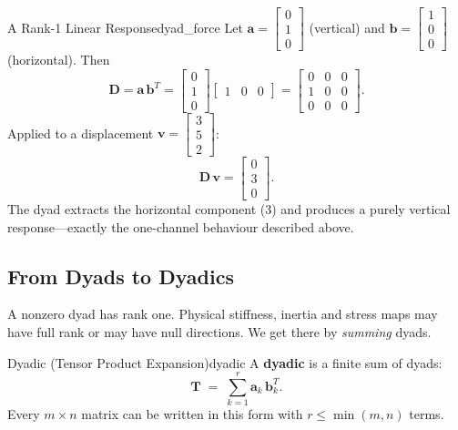 \begin{example}{A Rank-1 Linear Response}{dyad_force}
Let $\mathbf{a} = \begin{bmatrix}0\\1\\0\end{bmatrix}$ (vertical)
and $\mathbf{b} = \begin{bmatrix}1\\0\\0\end{bmatrix}$ (horizontal).
Then
\[
  \mathbf{D}
  = \mathbf{a}\,\mathbf{b}^{T}
  = \begin{bmatrix}0\\1\\0\end{bmatrix}
    \begin{bmatrix}1&0&0\end{bmatrix}
  = \begin{bmatrix}0&0&0\\1&0&0\\0&0&0\end{bmatrix}.
\]
Applied to a displacement
$\mathbf{v}=\begin{bmatrix}3\\5\\2\end{bmatrix}$:
\[
  \mathbf{D}\,\mathbf{v}
  = \begin{bmatrix}0\\3\\0\end{bmatrix}.
\]
The dyad extracts the horizontal component ($3$) and produces a
purely vertical response---exactly the one-channel behaviour
described above.
\end{example}

\subsection{From Dyads to Dyadics}
\label{subsec:dyadics}

A nonzero dyad has rank one. Physical stiffness, inertia and stress maps may have full rank or may have null directions.  We get there by \emph{summing} dyads.

\begin{definition}{\texorpdfstring{Dyadic (Tensor Product Expansion)}{Dyadic (Tensor Product Expansion)}}{dyadic}
A \textbf{dyadic} is a finite sum of dyads:
\[
  \mathbf{T}
  \;=\;
  \sum_{k=1}^{r} \mathbf{a}_{k}\,\mathbf{b}_{k}^{T}.
\]
Every $m\times n$ matrix can be written in this form with
$r\leq\min(m,n)$ terms.
\end{definition}

